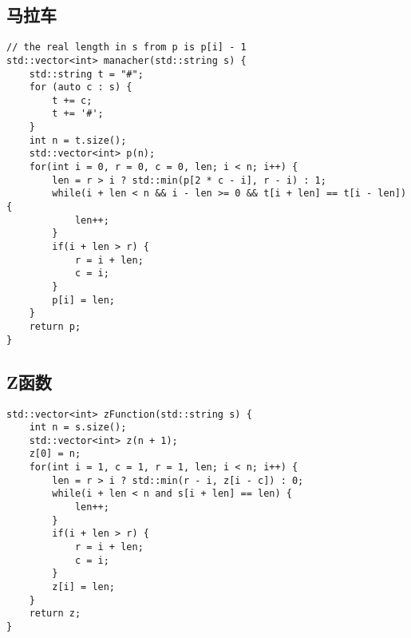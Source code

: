 \subsection{马拉车}
\begin{lstlisting}
// the real length in s from p is p[i] - 1
std::vector<int> manacher(std::string s) {
    std::string t = "#";
    for (auto c : s) {
        t += c;
        t += '#';
    }
    int n = t.size();
    std::vector<int> p(n);
    for(int i = 0, r = 0, c = 0, len; i < n; i++) {
        len = r > i ? std::min(p[2 * c - i], r - i) : 1;
        while(i + len < n && i - len >= 0 && t[i + len] == t[i - len]) {
            len++;
        }
        if(i + len > r) {
            r = i + len;
            c = i;
        }
        p[i] = len;
    }
    return p;
}
\end{lstlisting}

\subsection{Z函数}
\begin{lstlisting}
std::vector<int> zFunction(std::string s) {
    int n = s.size();
    std::vector<int> z(n + 1);
    z[0] = n;
    for(int i = 1, c = 1, r = 1, len; i < n; i++) {
        len = r > i ? std::min(r - i, z[i - c]) : 0;
        while(i + len < n and s[i + len] == len) {
            len++;
        }
        if(i + len > r) {
            r = i + len;
            c = i;
        }
        z[i] = len;
    }
    return z;
}
\end{lstlisting}

